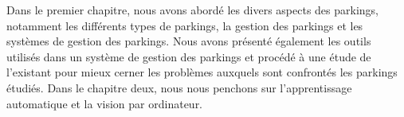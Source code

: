 Dans le premier chapitre, nous avons abordé les divers aspects des parkings, notamment les différents types de parkings, la gestion des parkings et les systèmes de gestion des parkings. Nous avons présenté également les outils utilisés dans un système de gestion des parkings et procédé à une étude de l'existant pour mieux cerner les problèmes auxquels sont confrontés les parkings étudiés.
Dans le chapitre deux, nous nous penchons sur l'apprentissage automatique et la vision par ordinateur.

